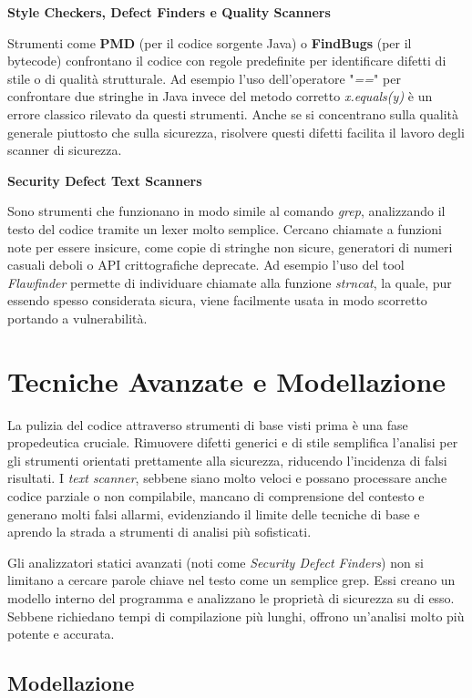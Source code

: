 \textbf{Style Checkers, Defect Finders e Quality Scanners}

Strumenti come \textbf{PMD} (per il codice sorgente Java) o \textbf{FindBugs} (per il 
bytecode) confrontano il codice con regole predefinite per identificare difetti di 
stile o di qualità strutturale. Ad esempio l'uso dell'operatore "\textit{==}" per 
confrontare due stringhe in Java invece del metodo corretto \textit{x.equals(y)} è un 
errore classico rilevato da questi strumenti. Anche se si concentrano sulla qualità 
generale piuttosto che sulla sicurezza, risolvere questi difetti facilita il lavoro 
degli scanner di sicurezza.

\textbf{Security Defect Text Scanners}

Sono strumenti che funzionano in modo simile al comando \textit{grep}, analizzando 
il testo del codice tramite un lexer molto semplice. Cercano chiamate a funzioni note 
per essere insicure, come copie di stringhe non sicure, generatori di numeri casuali 
deboli o API crittografiche deprecate. Ad esempio l'uso del tool \textit{Flawfinder}
permette di individuare chiamate alla funzione \textit{strncat}, la quale, pur essendo
spesso considerata sicura, viene facilmente usata in modo scorretto portando a 
vulnerabilità.

\section{Tecniche Avanzate e Modellazione}

La pulizia del codice attraverso strumenti di base visti prima è una fase propedeutica 
cruciale. Rimuovere difetti generici e di stile semplifica l'analisi per gli 
strumenti orientati prettamente alla sicurezza, riducendo l'incidenza di falsi 
risultati. I \textit{text scanner}, sebbene siano molto veloci e possano processare 
anche codice parziale o non compilabile, mancano di comprensione del contesto e 
generano molti falsi allarmi, evidenziando il limite delle tecniche di base e 
aprendo la strada a strumenti di analisi più sofisticati.

Gli analizzatori statici avanzati (noti come \textit{Security Defect Finders}) non si 
limitano a cercare parole chiave nel testo come un semplice grep. Essi creano un 
modello interno del programma e analizzano le proprietà di sicurezza su di esso. 
Sebbene richiedano tempi di compilazione più lunghi, offrono un'analisi molto più 
potente e accurata.

\subsection{Modellazione}

